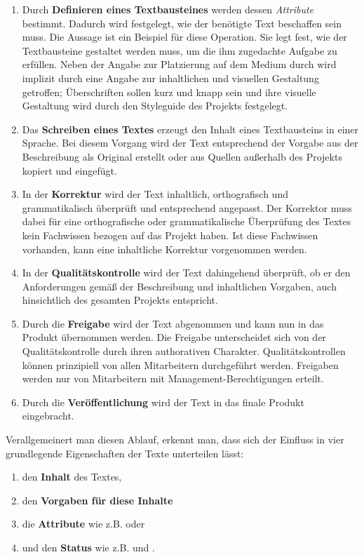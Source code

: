 \begin{enumerate}
\item Durch \textbf{Definieren eines Textbausteines} werden dessen \emph{Attribute} bestimmt. Dadurch wird festgelegt, wie der benötigte Text beschaffen sein muss. Die Aussage  ist ein Beispiel für diese Operation. Sie legt fest, wie der Textbausteine gestaltet werden muss, um die ihm zugedachte Aufgabe zu erfüllen. Neben der Angabe zur Platzierung auf dem Medium durch  wird implizit durch  eine Angabe zur inhaltlichen und visuellen Gestaltung getroffen; Überschriften sollen kurz und knapp sein und ihre visuelle Gestaltung wird durch den Styleguide des Projekts festgelegt.
\item Das \textbf{Schreiben eines Textes} erzeugt den Inhalt eines Textbausteins in einer Sprache. Bei diesem Vorgang wird der Text entsprechend der Vorgabe aus der Beschreibung als Original erstellt oder aus Quellen außerhalb des Projekts kopiert und eingefügt.
\item In der \textbf{Korrektur} wird der Text inhaltlich, orthografisch und grammatikalisch überprüft und entsprechend angepasst. Der Korrektor muss dabei für eine orthografische oder grammatikalische Überprüfung des Textes kein Fachwissen bezogen auf das Projekt haben. Ist diese Fachwissen vorhanden, kann eine inhaltliche Korrektur vorgenommen werden.
\item In der \textbf{Qualitätskontrolle} wird der Text dahingehend überprüft, ob er den Anforderungen gemäß der Beschreibung und inhaltlichen Vorgaben, auch hinsichtlich des gesamten Projekts entspricht.
\item Durch die \textbf{Freigabe} wird der Text abgenommen und kann nun in das Produkt übernommen werden. Die Freigabe unterscheidet sich von der Qualitätskontrolle durch ihren authorativen Charakter. Qualitätskontrollen können prinzipiell von allen Mitarbeitern durchgeführt werden. Freigaben werden nur von Mitarbeitern mit Management-Berechtigungen erteilt.
\item Durch die \textbf{Veröffentlichung} wird der Text in das finale Produkt eingebracht.
\end{enumerate}

\begin{samepage}
Verallgemeinert man diesen Ablauf, erkennt man, dass sich der Einfluss in vier grundlegende Eigenschaften der Texte unterteilen lässt:

\begin{enumerate}\itemsep -5pt
\item den \textbf{Inhalt} des Textes,
\item den \textbf{Vorgaben für diese Inhalte}
\item die \textbf{Attribute} wie z.B.  oder 
\item und den \textbf{Status} wie z.B.  und .
\end{enumerate}
\end{samepage}

